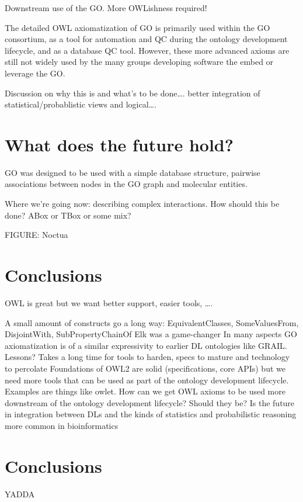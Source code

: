\documentclass{llncs}
\begin{document}
Downstream use of the GO. More OWLishness required!

The detailed OWL axiomatization of GO is primarily used within the GO consortium, as a tool for automation and QC during the ontology development lifecycle, and as a database QC tool. However, these more advanced axioms are still not widely used by the many groups developing software the embed or leverage the GO.

Discussion on why this is and what’s to be done…. better integration of statistical/probablistic views and logical….


\section{What does the future hold?}



GO was designed to be used with a simple database structure, pairwise associations between nodes in the GO graph and molecular entities. 

Where we’re going now: describing complex interactions. How should this be done? ABox or TBox or some mix? 

FIGURE: Noctua

\section{Conclusions}


OWL is great but we want better support, easier tools, ….

A small amount of constructs go a long way: EquivalentClasses, SomeValuesFrom, DisjointWith, SubProperty{Chain}Of
Elk was a game-changer
In many aspects GO axiomatization is of a similar expressivity to earlier DL ontologies like GRAIL. Lessons? Takes a long time for tools to harden, specs to mature and technology to percolate
Foundations of OWL2 are solid (specifications, core APIs) but we need more tools that can be used as part of the ontology development lifecycle. Examples are things like owlet.
How can we get OWL axioms to be used more downstream of the ontology development lifecycle? Should they be? Is the future in integration between DLs and the kinds of statistics and probabilistic reasoning more common in bioinformatics























\section{Conclusions}

YADDA



\end{document}

